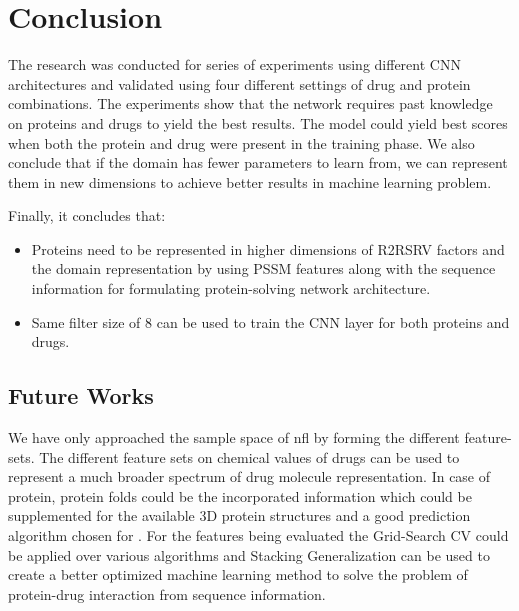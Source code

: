 \chapter{Conclusion}

The research was conducted for series of experiments using different CNN architectures and validated using four different settings of drug and protein combinations. The experiments show that the network requires past knowledge on proteins and drugs to yield the best results. The model could yield best scores when both the protein and drug were present in the training phase. We also conclude that if the domain has fewer parameters to learn from, we can represent them in new dimensions to achieve better results in machine learning problem.

Finally, it concludes that:
\begin{itemize}
    \item Proteins need to be represented in higher dimensions of R2RSRV factors and the domain representation by using PSSM features along with the sequence information for formulating protein-solving network architecture.
    \item Same filter size of 8 can be used to train the CNN layer for both proteins and drugs.
\end{itemize}

\section{Future Works}

We have only approached the sample space of \acrfull{nfl} by forming the different feature-sets. The different feature sets on chemical values of drugs can be used to represent a much broader spectrum of drug molecule representation. In case of protein, protein folds could be the incorporated information which could be supplemented for the available 3D protein structures and a good prediction algorithm chosen for \cite{CASP82008}. For the features being evaluated the Grid-Search CV could be applied over various algorithms and Stacking Generalization can be used to create a better optimized machine learning method to solve the problem of protein-drug interaction from sequence information.

